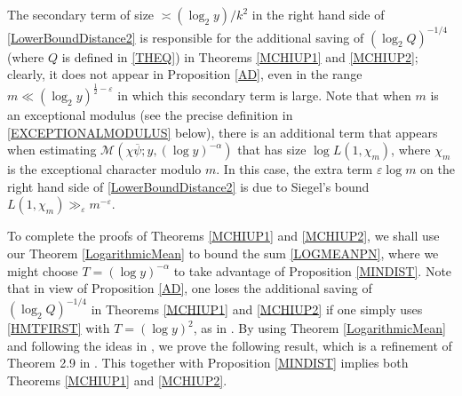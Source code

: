 \documentclass[12pt]{amsart}
\theoremstyle{definition}
\numberwithin{equation}{section}
\newcommand{\mb}{\mathbb}
\newcommand{\mc}{\mathcal}
\newcommand{\e}{\varepsilon}
\renewcommand{\bar}{\overline}
\begin{document}
The secondary term of size $\asymp (\log_2y)/k^2$ in the right hand side of \eqref{LowerBoundDistance2} is responsible for the additional saving of $(\log_2 Q)^{-1/4}$ (where $Q$ is defined in \eqref{THEQ}) in Theorems \ref{MCHIUP1} and \ref{MCHIUP2}; clearly, it does not appear in Proposition \ref{AD}, even in the range $m \ll (\log_2 y)^{\frac{1}{2}-\e}$ in which this secondary term is large.  Note that when $m$ is an exceptional modulus (see the precise definition in \eqref{EXCEPTIONALMODULUS} below), there is an additional term that appears when estimating $\mc{M}(\chi\bar{\psi}; y, (\log y)^{-\alpha})$  that has size $\log L(1, \chi_m)$, where $\chi_m$ is the exceptional character modulo $m$. In this case, the extra term $\varepsilon\log m$ on the right hand side of \eqref{LowerBoundDistance2} is due to Siegel's bound $L(1,\chi_m)\gg_{\e} m^{-\varepsilon}$. 



 

To complete the proofs of Theorems \ref{MCHIUP1} and \ref{MCHIUP2}, we shall use our Theorem \ref{LogarithmicMean} to bound the sum \eqref{LOGMEANPN}, where we might choose $T=(\log y)^{-\alpha}$ to take advantage of Proposition \ref{MINDIST}. Note that in view of Proposition \ref{AD}, one loses the additional saving of $(\log_2 Q)^{-1/4}$ in Theorems \ref{MCHIUP1} and \ref{MCHIUP2} if one simply uses \eqref{HMTFIRST} with $T=(\log y)^2$, as in \cite{GOLD}. By using Theorem \ref{LogarithmicMean} and following the ideas in \cite{GrSo2}, we prove the following result, which is a refinement of Theorem 2.9 in \cite{GOLD}. This together with Proposition \ref{MINDIST} implies both Theorems \ref{MCHIUP1} and  \ref{MCHIUP2}.
\end{document}
